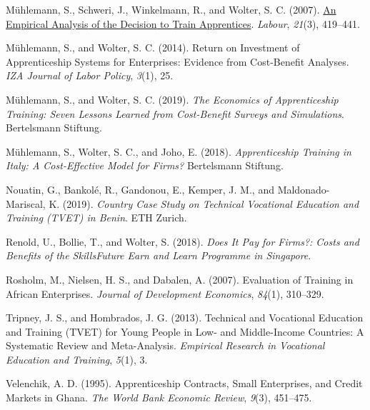 \documentclass[
  11pt,
a4paper
]{report}
\newlength{\cslhangindent}
\newenvironment{CSLReferences}[2] %
 {%
  \setlength{\parindent}{0pt}
  \ifodd #1 \everypar{\setlength{\hangindent}{\cslhangindent}}\ignorespaces\fi
  \ifnum #2 > 0
  \setlength{\parskip}{#2\baselineskip}
  \fi
 }%
 {}
\begin{document}
\begin{CSLReferences}{1}{0}
\leavevmode{}%
Mühlemann, S., Schweri, J., Winkelmann, R., and Wolter, S. C. (2007). \href{https://doi.org/10.1111/j.1467-9914.2007.00379.x}{An {Empirical Analysis} of the {Decision} to {Train Apprentices}}. \emph{Labour}, \emph{21}(3), 419--441.

\leavevmode{}%
Mühlemann, S., and Wolter, S. C. (2014). Return on {Investment} of {Apprenticeship Systems} for {Enterprises}: {Evidence} from {Cost-Benefit Analyses}. \emph{IZA Journal of Labor Policy}, \emph{3}(1), 25.

\leavevmode{}%
Mühlemann, S., and Wolter, S. C. (2019). \emph{The {Economics} of {Apprenticeship Training}: {Seven Lessons Learned} from {Cost-Benefit Surveys} and {Simulations}}. {Bertelsmann Stiftung}.

\leavevmode{}%
Mühlemann, S., Wolter, S. C., and Joho, E. (2018). \emph{Apprenticeship {Training} in {Italy}: {A Cost-Effective Model} for {Firms}?} {Bertelsmann Stiftung}.

\leavevmode{}%
Nouatin, G., Bankolé, R., Gandonou, E., Kemper, J. M., and Maldonado-Mariscal, K. (2019). \emph{Country {Case Study} on {Technical Vocational Education} and {Training} ({TVET}) in {Benin}}. {ETH Zurich}.

\leavevmode{}%
Renold, U., Bollie, T., and Wolter, S. (2018). \emph{Does {It Pay} for {Firms}?: {Costs} and {Benefits} of the {SkillsFuture Earn} and {Learn Programme} in {Singapore}}.

\leavevmode{}%
Rosholm, M., Nielsen, H. S., and Dabalen, A. (2007). Evaluation of {Training} in {African Enterprises}. \emph{Journal of Development Economics}, \emph{84}(1), 310--329.

\leavevmode{}%
Tripney, J. S., and Hombrados, J. G. (2013). Technical and {Vocational Education} and {Training} ({TVET}) for {Young People} in {Low-} and {Middle-Income Countries}: {A Systematic Review} and {Meta-Analysis}. \emph{Empirical Research in Vocational Education and Training}, \emph{5}(1), 3.

\leavevmode{}%
Velenchik, A. D. (1995). Apprenticeship {Contracts}, {Small Enterprises}, and {Credit Markets} in {Ghana}. \emph{The World Bank Economic Review}, \emph{9}(3), 451--475.


\end{CSLReferences}
\end{document}
